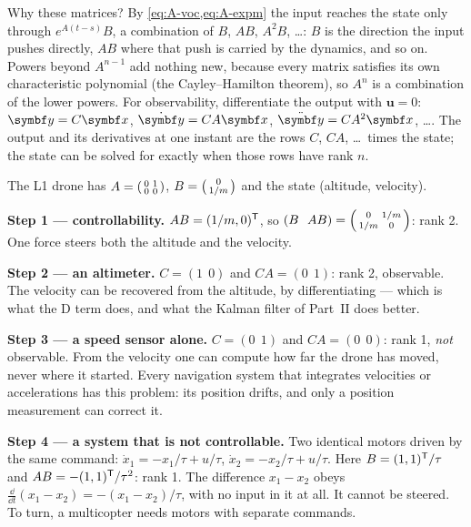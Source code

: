 Why these matrices? By \cref{eq:A-voc,eq:A-expm} the input reaches the state only through $e^{A(t-s)}B$, a combination of $B$, $AB$, $A^2B$, \dots: $B$ is the direction the input pushes directly, $AB$ where that push is carried by the dynamics, and so on. Powers beyond $A^{n-1}$ add nothing new, because every matrix satisfies its own characteristic polynomial (the Cayley–Hamilton theorem), so $A^n$ is a combination of the lower powers. For observability, differentiate the output with $\symbf u = 0$: $\symbf y = C\vx$, $\dot{\symbf y} = CA\vx$, $\ddot{\symbf y} = CA^2\vx$, \dots. The output and its derivatives at one instant are the rows $C$, $CA$, \dots\ times the state; the state can be solved for exactly when those rows have rank $n$.

\begin{example}
\label{ex:A-rank}
The L1 drone has $A = \begin{psmallmatrix}0 & 1\\ 0 & 0\end{psmallmatrix}$, $B = \begin{psmallmatrix}0\\ 1/m\end{psmallmatrix}$ and the state (altitude, velocity).

\textbf{Step 1 — controllability.} $AB = (1/m, 0)^{\mathsf{T}}$, so $(B\ \ AB) = \begin{psmallmatrix}0 & 1/m\\ 1/m & 0\end{psmallmatrix}$: rank 2. One force steers both the altitude and the velocity.

\textbf{Step 2 — an altimeter.} $C = (1\ \ 0)$ and $CA = (0\ \ 1)$: rank 2, observable. The velocity can be recovered from the altitude, by differentiating — which is what the D term does, and what the Kalman filter of Part~II does better.

\textbf{Step 3 — a speed sensor alone.} $C = (0\ \ 1)$ and $CA = (0\ \ 0)$: rank 1, \emph{not} observable. From the velocity one can compute how far the drone has moved, never where it started. Every navigation system that integrates velocities or accelerations has this problem: its position drifts, and only a position measurement can correct it.

\textbf{Step 4 — a system that is not controllable.} Two identical motors driven by the same command: $\dot x_1 = -x_1/\tau + u/\tau$, $\dot x_2 = -x_2/\tau + u/\tau$. Here $B = (1, 1)^{\mathsf{T}}/\tau$ and $AB = -(1, 1)^{\mathsf{T}}/\tau^2$: rank 1. The difference $x_1 - x_2$ obeys $\frac{\dd}{\dd t}(x_1 - x_2) = -(x_1 - x_2)/\tau$, with no input in it at all. It cannot be steered. To turn, a multicopter needs motors with separate commands.
\end{example}

